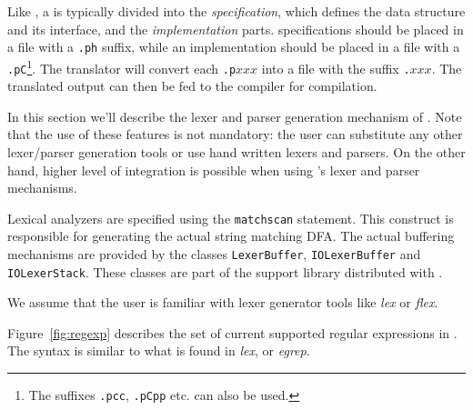 Like \Cpp, a \Prop{} is typically divided into the {\em specification},
which defines the data structure and its interface, and the
{\em implementation} parts.   \Prop{} specifications should
be placed in a file with a \verb|.ph| suffix, while an implementation
should be placed in a file with a \verb|.pC|\footnote{The suffixes {\tt .pcc},
{\tt .pCpp} etc. can also be used.}.  The translator will convert each
\verb|.p|$xxx$ into a file with the suffix \verb|.|$xxx$.  The translated
output can then be fed to the \Cpp{} compiler for compilation.
\vspace{\fill}

 \label{sec:parser}

   In this section we'll describe the lexer and parser generation
mechanism of \Prop.  Note that the use of these features is not
mandatory: the user can substitute any other lexer/parser generation tools 
or use hand written lexers and parsers.  
On the other hand, higher level of integration is possible when using
\Prop's lexer and parser mechanisms.

   Lexical analyzers are specified using the \verb|matchscan|
statement.  This construct is responsible for generating the actual string
matching DFA.  The actual buffering mechanisms are provided by the
classes \verb|LexerBuffer|, \verb|IOLexerBuffer| and \verb|IOLexerStack|. 
These classes are part of the support library distributed with \Prop.

   We assume that the user is familiar with lexer generator tools like
{\em lex}\cite{lex} or {\em flex}\cite{flex}.

 \label{sec:regular-expressions}
   Figure~\ref{fig:regexp} describes the set of current
supported regular expressions in \Prop.  The syntax is similar
to what is found in {\em lex}, or {\em egrep}.

